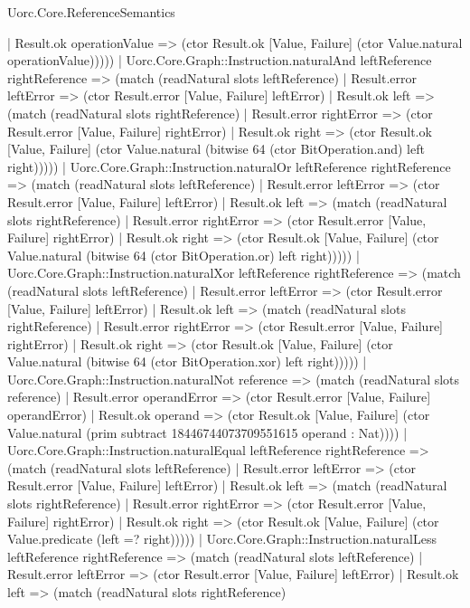 \begin{lexlean}{Uorc.Core.ReferenceSemantics}
\begin{semanticmodule}
{          | Result.ok operationValue => (ctor Result.ok [Value, Failure] (ctor Value.natural operationValue)))))
    | Uorc.Core.Graph::Instruction.naturalAnd leftReference rightReference => (match (readNatural slots leftReference)
      | Result.error leftError => (ctor Result.error [Value, Failure] leftError)
      | Result.ok left => (match (readNatural slots rightReference)
        | Result.error rightError => (ctor Result.error [Value, Failure] rightError)
        | Result.ok right => (ctor Result.ok [Value, Failure] (ctor Value.natural (bitwise 64 (ctor BitOperation.and) left right)))))
    | Uorc.Core.Graph::Instruction.naturalOr leftReference rightReference => (match (readNatural slots leftReference)
      | Result.error leftError => (ctor Result.error [Value, Failure] leftError)
      | Result.ok left => (match (readNatural slots rightReference)
        | Result.error rightError => (ctor Result.error [Value, Failure] rightError)
        | Result.ok right => (ctor Result.ok [Value, Failure] (ctor Value.natural (bitwise 64 (ctor BitOperation.or) left right)))))
    | Uorc.Core.Graph::Instruction.naturalXor leftReference rightReference => (match (readNatural slots leftReference)
      | Result.error leftError => (ctor Result.error [Value, Failure] leftError)
      | Result.ok left => (match (readNatural slots rightReference)
        | Result.error rightError => (ctor Result.error [Value, Failure] rightError)
        | Result.ok right => (ctor Result.ok [Value, Failure] (ctor Value.natural (bitwise 64 (ctor BitOperation.xor) left right)))))
    | Uorc.Core.Graph::Instruction.naturalNot reference => (match (readNatural slots reference)
      | Result.error operandError => (ctor Result.error [Value, Failure] operandError)
      | Result.ok operand => (ctor Result.ok [Value, Failure] (ctor Value.natural (prim subtract 18446744073709551615 operand : Nat))))
    | Uorc.Core.Graph::Instruction.naturalEqual leftReference rightReference => (match (readNatural slots leftReference)
      | Result.error leftError => (ctor Result.error [Value, Failure] leftError)
      | Result.ok left => (match (readNatural slots rightReference)
        | Result.error rightError => (ctor Result.error [Value, Failure] rightError)
        | Result.ok right => (ctor Result.ok [Value, Failure] (ctor Value.predicate (left =? right)))))
    | Uorc.Core.Graph::Instruction.naturalLess leftReference rightReference => (match (readNatural slots leftReference)
      | Result.error leftError => (ctor Result.error [Value, Failure] leftError)
      | Result.ok left => (match (readNatural slots rightReference)
}
\end{semanticmodule}
\end{lexlean}
